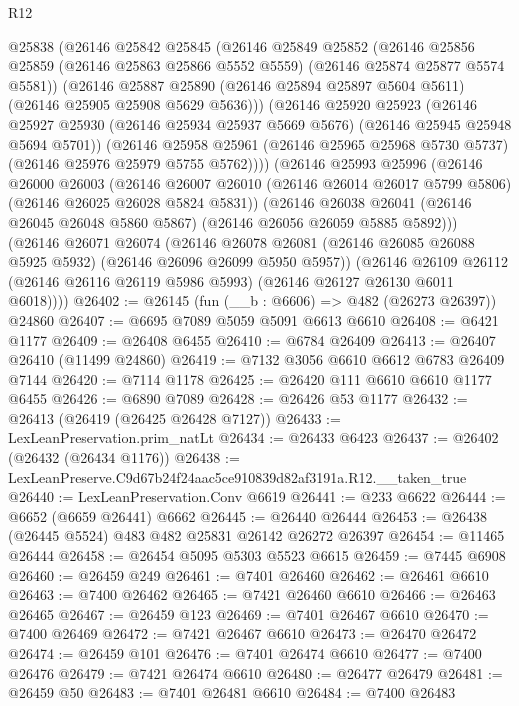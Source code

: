 \begin{lexlean}{R12}
\begin{coremodule}
    @25838
    (@26146
      @25842
      @25845
      (@26146
        @25849
        @25852
        (@26146 @25856 @25859 (@26146 @25863 @25866 @5552 @5559) (@26146 @25874 @25877 @5574 @5581))
        (@26146
          @25887
          @25890
          (@26146 @25894 @25897 @5604 @5611)
          (@26146 @25905 @25908 @5629 @5636)))
      (@26146
        @25920
        @25923
        (@26146 @25927 @25930 (@26146 @25934 @25937 @5669 @5676) (@26146 @25945 @25948 @5694 @5701))
        (@26146
          @25958
          @25961
          (@26146 @25965 @25968 @5730 @5737)
          (@26146 @25976 @25979 @5755 @5762))))
    (@26146
      @25993
      @25996
      (@26146
        @26000
        @26003
        (@26146 @26007 @26010 (@26146 @26014 @26017 @5799 @5806) (@26146 @26025 @26028 @5824 @5831))
        (@26146
          @26038
          @26041
          (@26146 @26045 @26048 @5860 @5867)
          (@26146 @26056 @26059 @5885 @5892)))
      (@26146
        @26071
        @26074
        (@26146 @26078 @26081 (@26146 @26085 @26088 @5925 @5932) (@26146 @26096 @26099 @5950 @5957))
        (@26146
          @26109
          @26112
          (@26146 @26116 @26119 @5986 @5993)
          (@26146 @26127 @26130 @6011 @6018))))
@26402 := @26145 (fun (__b : @6606) => @482 (@26273 @26397)) @24860
@26407 := @6695 @7089 @5059 @5091 @6613 @6610
@26408 := @6421 @1177
@26409 := @26408 @6455
@26410 := @6784 @26409
@26413 := @26407 @26410 (@11499 @24860)
@26419 := @7132 @3056 @6610 @6612 @6783 @26409 @7144
@26420 := @7114 @1178
@26425 := @26420 @111 @6610 @6610 @1177 @6455
@26426 := @6890 @7089
@26428 := @26426 @53 @1177
@26432 := @26413 (@26419 (@26425 @26428 @7127))
@26433 := LexLeanPreservation.prim_natLt
@26434 := @26433 @6423
@26437 := @26402 (@26432 (@26434 @1176))
@26438 := LexLeanPreserve.C9d67b24f24aac5ce910839d82af3191a.R12.__taken_true
@26440 := LexLeanPreservation.Conv @6619
@26441 := @233 @6622
@26444 := @6652 (@6659 @26441) @6662
@26445 := @26440 @26444
@26453 := @26438 (@26445 @5524) @483 @482 @25831 @26142 @26272 @26397
@26454 := @11465 @26444
@26458 := @26454 @5095 @5303 @5523 @6615
@26459 := @7445 @6908
@26460 := @26459 @249
@26461 := @7401 @26460
@26462 := @26461 @6610
@26463 := @7400 @26462
@26465 := @7421 @26460 @6610
@26466 := @26463 @26465
@26467 := @26459 @123
@26469 := @7401 @26467 @6610
@26470 := @7400 @26469
@26472 := @7421 @26467 @6610
@26473 := @26470 @26472
@26474 := @26459 @101
@26476 := @7401 @26474 @6610
@26477 := @7400 @26476
@26479 := @7421 @26474 @6610
@26480 := @26477 @26479
@26481 := @26459 @50
@26483 := @7401 @26481 @6610
@26484 := @7400 @26483

\end{coremodule}
\end{lexlean}
